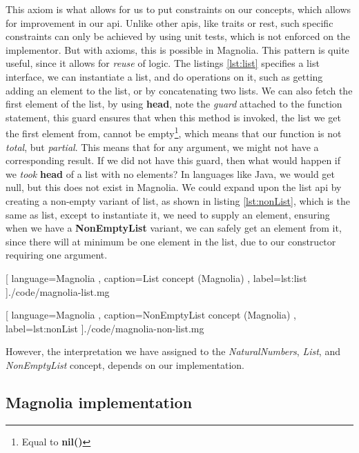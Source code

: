 This axiom is what allows for us to put constraints on our concepts, which
allows for improvement in our \gls*{api}. Unlike other \gls*{api}s, like traits or
\gls*{rest}, such specific constraints can only be achieved by using unit tests,
which is not enforced on the implementor. But with axioms, this is possible in
Magnolia. This pattern is quite useful, since it allows for \textit{reuse} of
logic. The listings \ref{lst:list} specifies a list interface, we can
instantiate a list, and do operations on it, such as getting adding an element to
the list, or by concatenating two lists. We can also fetch the first element of
the list, by using \textbf{head}, note the \textit{guard} attached to the
function statement, this guard ensures that when this method is invoked, the
list we get the first element from, cannot be empty\footnote{Equal to \textbf{nil()}},
which means that our function is not \textit{total}, but \textit{partial}. This
means that for any argument, we might not have a corresponding result. If we did
not have this guard, then what would happen if we \textit{took} \textbf{head} of a list
with no elements? In languages like Java, we would get null, but this does not
exist in Magnolia. We could expand upon the list \gls*{api} by creating a
non-empty variant of list, as shown in listing \ref{lst:nonList}, which is the
same as list, except to instantiate it, we need to supply an element, ensuring
when we have a \textbf{NonEmptyList} variant, we can safely get an element from
it, since there will at minimum be one element in the list, due to our
constructor requiring one argument.

\begin{code}[H]
  
    [ language=Magnolia
    , caption={List concept (Magnolia)}
    , label=lst:list
    ]{./code/magnolia-list.mg}
\end{code}

\begin{code}[H]
  
    [ language=Magnolia
    , caption={NonEmptyList concept (Magnolia)}
    , label=lst:nonList
    ]{./code/magnolia-non-list.mg}
\end{code}

However, the interpretation we have assigned to the \textit{NaturalNumbers},
\textit{List}, and \textit{NonEmptyList} concept, depends on our implementation.

\subsection{Magnolia implementation}

